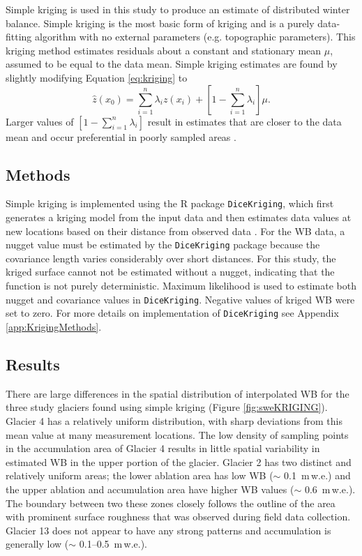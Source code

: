 \documentclass{sfuthesis}
\begin{document}
Simple kriging is used in this study to produce an estimate of distributed winter balance. Simple kriging is the most basic form of kriging and is a purely data-fitting algorithm with no external parameters (e.g. topographic parameters). This kriging method estimates residuals about a constant and stationary mean $\mu$, assumed to be equal to the data mean. Simple kriging estimates are found by slightly modifying Equation \ref{eq:kriging} to 
\begin{equation}
\hat{z}(x_0) = \sum_{i=1}^{n} \lambda_i z(x_i) +\left[1-\sum_{i=1}^{n} \lambda_i \right]\mu.
\end{equation}
Larger values of $\left[1-\sum_{i=1}^{n} \lambda_i \right]$ result in estimates that are closer to the data mean and occur preferential in poorly sampled areas \citep{Li2008}.

\subsection{Methods}
\label{sec:kriging_methods}

Simple kriging is implemented using the R package \texttt{DiceKriging}, which first generates a kriging model from the input data and then estimates data values at new locations based on their distance from observed data \citep{Roustant2012}. For the WB data, a nugget value must be estimated by the \texttt{DiceKriging} package because the covariance length varies considerably over short distances. For this study, the kriged surface cannot not be estimated without a nugget, indicating that the function is not purely deterministic. Maximum likelihood is used to estimate both nugget and covariance values in \texttt{DiceKriging}. Negative values of kriged WB were set to zero. For more details on implementation of \texttt{DiceKriging} see Appendix \ref{app:KrigingMethods}.

\subsection{Results}

There are large differences in the spatial distribution of interpolated WB for the three study glaciers found using simple kriging (Figure \ref{fig:sweKRIGING}). Glacier 4 has a relatively uniform distribution, with sharp deviations from this mean value at many measurement locations. The low density of sampling points in the accumulation area of Glacier 4 results in little spatial variability in estimated WB in the upper portion of the glacier. Glacier 2 has two distinct and relatively uniform areas; the lower ablation area has low WB ($\sim$ 0.1 \,m\,w.e.) and the upper ablation and accumulation area have higher WB values ($\sim$ 0.6 \,m\,w.e.). The boundary between two these zones closely follows the outline of the area with prominent surface roughness that was observed during field data collection. Glacier 13 does not appear to have any strong patterns and accumulation is generally low ($\sim$ 0.1--0.5 \,m\,w.e.). 
\end{document}

